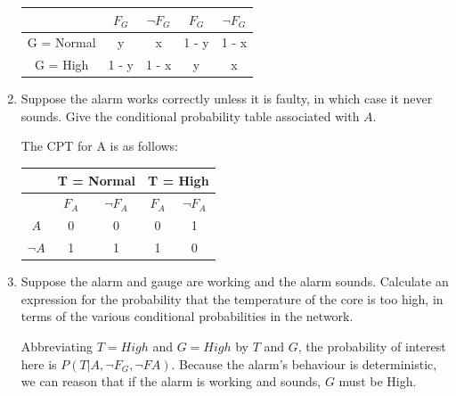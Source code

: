 \documentclass[9pt,a4paper]{extarticle}
\newenvironment{solution}
    {%
    \color{red}
    }
    { 
    \color{black}
    }
\begin{document}
\begin{enumerate}
\begin{solution}
\begin{table}[h]
\begin{tabular}{|c|c|c|c|c|}
             & $F_G$ & $\lnot F_G$ & $F_G$ & $\lnot F_G$ \\ \hline
             G = Normal & y & x & 1 - y & 1 - x\\ \hline
             G = High & 1 - y & 1 - x & y & x \\ \hline 
        \end{tabular}
    \end{table}
    \end{solution}
    \item Suppose the alarm works correctly unless it is faulty, in which case it never sounds. Give the conditional probability table associated with $A$.
    \begin{solution}
    The CPT for A is as follows:
    \begin{table}[h]
        \centering
        \begin{tabular}{|c|c|c|c|c|}
        \hline
             &  \multicolumn{2}{c|}{T = Normal} & \multicolumn{2}{c|}{T = High} \\ \hline
             & $F_A$ & $\lnot F_A$ & $F_A$ & $\lnot F_A$ \\ \hline
             $A$ & 0 & 0 & 0 & 1\\ \hline
             $\lnot A$ & 1 & 1 & 1 & 0 \\ \hline 
        \end{tabular}
    \end{table}
    \end{solution}
    \item Suppose the alarm and gauge are working and the alarm sounds. Calculate an expression for the probability that the temperature of the core is too high, in terms of the various conditional probabilities in the network.
    \begin{solution}
    
    Abbreviating $T = High$ and $G = High$ by $T$ and $G$, the probability of interest here is $P(T|A,\lnot F_G, \lnot FA)$. Because the alarm’s behaviour is deterministic, we can reason that if the alarm is working and sounds, $G$ must be High.
    

\end{solution}
\end{enumerate}
\end{document}
